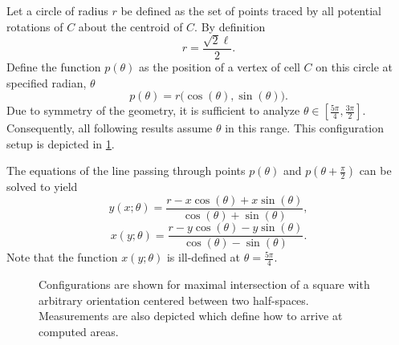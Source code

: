 Let a circle of radius $r$ be defined as the set of points traced by all potential rotations of $C$ about the centroid of $C$.
By definition
\begin{equation}
	r=\frac{\sqrt{2}\ell}{2}.
\end{equation}
Define the function $p(\theta)$ as the position of a vertex of cell $C$ on this circle at specified radian, $\theta$
\begin{equation}
	p(\theta) = r \big(\cos(\theta),\sin(\theta)\big).
\end{equation}
Due to symmetry of the geometry, it is sufficient to analyze $\theta \in [\frac{5\pi}{4},\frac{3\pi}{2}]$.
Consequently, all following results assume $\theta$ in this range.
This configuration setup is depicted in \cref{fig:proof_pic}.

The equations of the line passing through points $p(\theta)$ and $p(\theta + \frac{\pi}{2})$ can be solved to yield
\begin{equation}
	y(x;\theta) = \frac{r - x \cos(\theta) + x \sin(\theta)}{\cos(\theta) + \sin(\theta)},
\end{equation}
\begin{equation}
	x(y;\theta) = \frac{r - y \cos(\theta) - y \sin(\theta)}{\cos(\theta) - \sin(\theta)}.
\end{equation}
Note that the function $x(y;\theta)$ is ill-defined at $\theta=\frac{5\pi}{4}$.

\begin{figure}
\centering
	\qquad
	\qquad
	\caption{Configurations are shown for maximal intersection of a square with arbitrary orientation centered between two half-spaces.
	Measurements are also depicted which define how to arrive at computed areas.}
	\label{fig:proof_pic}
\end{figure}

